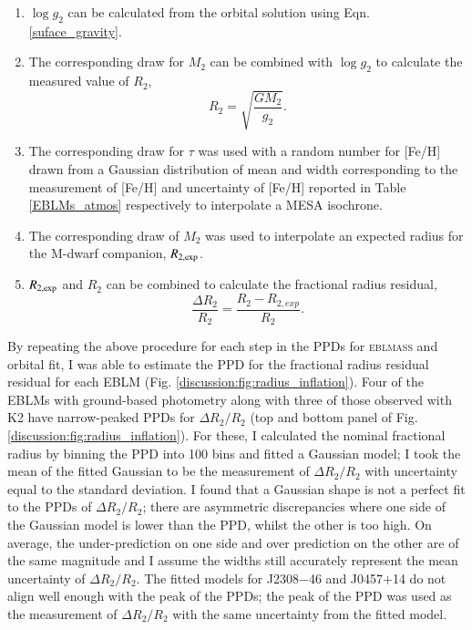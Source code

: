 \begin{enumerate}
    \item $\log g_2$ can be calculated from the orbital solution using Eqn. \ref{suface_gravity}. 
    
    \item The corresponding draw for $M_2$ can be combined with $\log g_2$ to calculate the measured value of $R_2$,
    \begin{equation}\label{r2_from_m2_and_g2}
        R_2 = \sqrt{\frac{G M_2}{g_2}}.
    \end{equation}
    
    \item The corresponding draw for $\tau$ was used with a random number for [Fe/H] drawn from a Gaussian distribution of mean and width corresponding to the measurement of [Fe/H] and uncertainty of [Fe/H] reported in Table \ref{EBLMs_atmos} respectively to interpolate a MESA isochrone.
    
    \item The corresponding draw of $M_2$ was used to interpolate an expected radius for the M-dwarf companion, $R_{2, \rm exp}$. 
    
    \item $R_{2, \rm exp}$ and $R_2$ can be combined to calculate the fractional radius residual,
    \begin{equation}
        \frac{\Delta R_2}{R_2} = \frac{R_2 - R_{2,exp}}{R_2}.
    \end{equation}
\end{enumerate}

By repeating the above procedure for each step in the PPDs for \textsc{eblmass} and orbital fit, I was able to estimate the PPD for the fractional radius residual residual for each EBLM (Fig. \ref{discussion:fig:radius_inflation}). Four of the EBLMs with ground-based photometry along with three of those observed with K2 have narrow-peaked PPDs for $\Delta R_2 / R_2$ (top and bottom panel of Fig. \ref{discussion:fig:radius_inflation}). For these, I calculated the nominal fractional radius by binning the PPD into 100 bins and fitted a Gaussian model; I took the mean of the fitted Gaussian to be the measurement of $\Delta R_2 / R_2$ with uncertainty equal to the standard deviation. I found that a Gaussian shape is not a perfect fit to the PPDs of $\Delta R_2 / R_2$; there are asymmetric discrepancies where one side of the Gaussian model is lower than the PPD, whilst the other is too high. On average, the under-prediction on one side and over prediction on the other are of the same magnitude and I assume the widths still accurately represent the mean uncertainty of $\Delta R_2 / R_2$. The fitted models for J2308$-$46 and J0457$+$14 do not align well enough with the peak of the PPDs; the peak of the PPD was used as the measurement of $\Delta R_2 / R_2$ with the same uncertainty from the fitted model.

